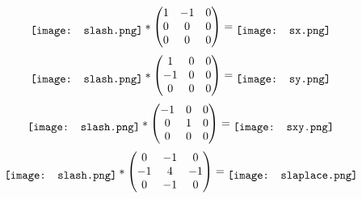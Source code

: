 \begin{itemize}
$$
\raisebox{-.5\height}{\texttt{[image: slash.png]}} *
\begin{pmatrix}
    1 & -1 & 0\\
    0 & 0 & 0\\
    0 & 0 & 0
\end{pmatrix} = 
\raisebox{-.5\height}{\texttt{[image: sx.png]}} 
$$
$$
\raisebox{-.5\height}{\texttt{[image: slash.png]}} *
\begin{pmatrix}
    1 & 0 & 0\\
    -1 & 0 & 0\\
    0 & 0 & 0
\end{pmatrix} = 
\raisebox{-.5\height}{\texttt{[image: sy.png]}} 
$$
$$
\raisebox{-.5\height}{\texttt{[image: slash.png]}} *
\begin{pmatrix}
    -1 & 0 & 0\\
    0 & 1 & 0\\
    0 & 0 & 0
\end{pmatrix} = 
\raisebox{-.5\height}{\texttt{[image: sxy.png]}} 
$$
$$
\raisebox{-.5\height}{\texttt{[image: slash.png]}} *
\begin{pmatrix}
    0 & -1 & 0\\
    -1 & 4 & -1\\
    0 & -1 & 0
\end{pmatrix} = 
\raisebox{-.5\height}{\texttt{[image: slaplace.png]}} 
$$



\end{itemize}
